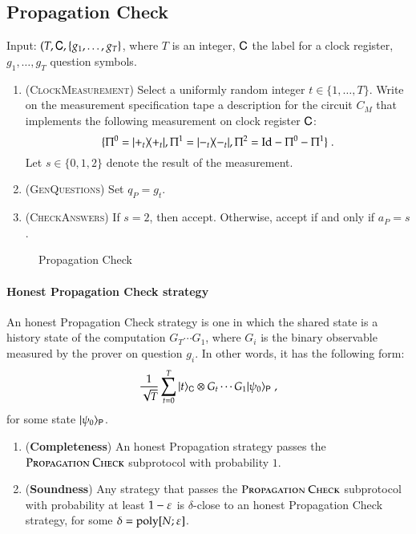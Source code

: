 \subsection{Propagation Check}

\begin{center}
\begin{mdframed}
    Input: $(T,{\textsf{C}},\{g_1,\ldots,g_T\}$, where $T$ is an integer, ${\textsf{C}}$ the label for a clock register,  $g_1,\ldots,g_T$ question symbols. 
	\begin{enumerate}
		\item (\textsc{ClockMeasurement}) Select a uniformly random integer $t\in\{1,\ldots,T\}$. Write on the measurement specification tape a description for the circuit $C_M$ that implements the following measurement on clock register ${\textsf{C}}$: 
\[
	\{ 	\Pi^0 = |+_t\rangle\! \langle +_t|, 
	\Pi^1 = |-_t\rangle\! \langle -_t|, 
	\Pi^2 = \mathop{\mathrm{Id}}\!\mathinner{} - \Pi^0 - \Pi^1 \}\;.
\]	
Let $s\in \{0,1,2\}$ denote the result of the measurement.
	\item (\textsc{GenQuestions}) Set $q_P = g_t$.
		\item (\textsc{CheckAnswers}) If $s = 2$, then accept. Otherwise, accept if and only if $a_P = s$. 
	\end{enumerate}    
\end{mdframed}

\end{center}
\begin{figure}[H]
\caption{Propagation Check}
\label{fig:prop_check_0}
\end{figure}




\paragraph{Honest Propagation Check strategy} An honest Propagation Check strategy is one in which the shared state is a history state of the computation $G_T\cdots G_1$, where $G_i$ is the binary observable measured by the prover on question $g_i$. In other words, it has the following form:
\[
	\frac{1}{\sqrt{T}} \sum_{t = 0}^{T} |t\rangle_{{\textsf{C}}} \otimes G_t\cdots G_1 |\psi_0\rangle_{{\mathsf{P}}}\;,
\]
for some state $|\psi_0\rangle_{{\mathsf{P}}}$.

\begin{lemma}	
\label{lem:prop_check_0}
\leavevmode
\begin{enumerate}
\item (\textbf{Completeness}) An honest Propagation strategy passes the $\textsc{Propagation Check}$ subprotocol with probability $1$. 
\item (\textbf{Soundness}) Any strategy that passes the $\textsc{Propagation Check}$ subprotocol with probability at least $1 - \varepsilon$ is $\delta$-close to an honest Propagation Check strategy, for some $\delta = \operatorname{poly}[N;\varepsilon]$.
\end{enumerate}
\end{lemma}







